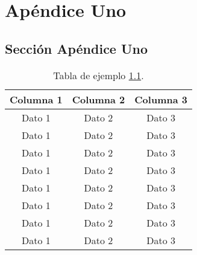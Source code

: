 
\chapter{Apéndice Uno}\label{apnx:uno}

\section{Sección Apéndice Uno}\label{apnx:uno:sec1}

\begin{table}[!h]
  \caption{Tabla de ejemplo \ref{tab:apnx:uno:sec1}.}
  \centering

  \begin{tabular}{ccc}
    \toprule
    \textbf{Columna 1} & \textbf{Columna 2} & \textbf{Columna 3}\\
    \midrule
    Dato 1             & Dato 2             & Dato 3            \\
    Dato 1             & Dato 2             & Dato 3            \\
    Dato 1             & Dato 2             & Dato 3            \\
    Dato 1             & Dato 2             & Dato 3            \\
    Dato 1             & Dato 2             & Dato 3            \\
    Dato 1             & Dato 2             & Dato 3            \\
    Dato 1             & Dato 2             & Dato 3            \\
    Dato 1             & Dato 2             & Dato 3            \\
    \bottomrule
  \end{tabular}
  \label{tab:apnx:uno:sec1}

\end{table}
